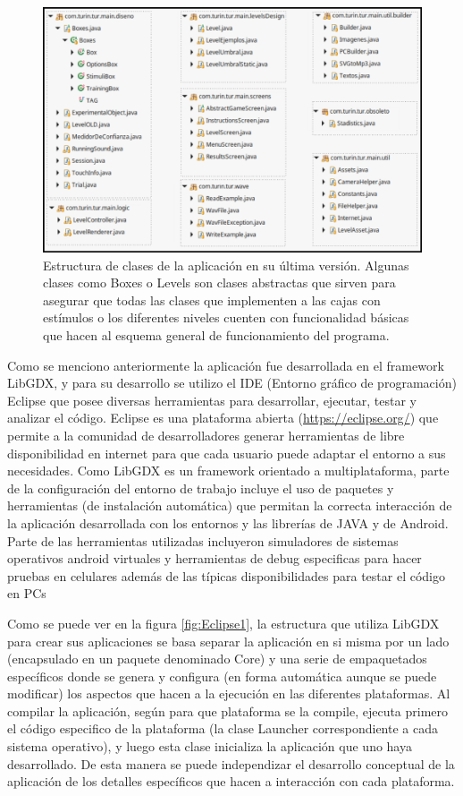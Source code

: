 \documentclass{article}
\begin{document}
    \begin{figure}
        \center
        \includegraphics[width=\textwidth]{Imagenes/Clases.png}
        \caption{Estructura de clases de la aplicación en su última versión. Algunas clases como Boxes o Levels son clases abstractas que sirven para asegurar que todas las clases que implementen a las cajas con estímulos o los diferentes niveles cuenten con funcionalidad básicas que hacen al esquema general de funcionamiento del programa.}
        \label{fig:Clases}
    \end{figure}
    
        
    Como se menciono anteriormente la aplicación fue desarrollada en el framework LibGDX, y para su desarrollo se utilizo el IDE (Entorno gráfico de programación) Eclipse que posee diversas herramientas para desarrollar, ejecutar, testar y analizar el código. Eclipse es una plataforma abierta (\url{https://eclipse.org/}) que permite a la comunidad de desarrolladores generar herramientas de libre disponibilidad en internet para que cada usuario puede adaptar el entorno a sus necesidades. Como LibGDX es un framework orientado a multiplataforma, parte de la configuración del entorno de trabajo incluye el uso de paquetes y herramientas (de instalación automática) que permitan la correcta interacción de la aplicación desarrollada con los entornos y las librerías de JAVA y de Android. Parte de las herramientas utilizadas incluyeron simuladores de sistemas operativos android virtuales y herramientas de debug especificas para hacer pruebas en celulares además de las típicas disponibilidades para testar el código en PCs
    
    Como se puede ver en la figura \ref{fig:Eclipse1}, la estructura que utiliza LibGDX para crear sus aplicaciones se basa separar la aplicación en si misma por un lado (encapsulado en un paquete denominado Core) y una serie de empaquetados específicos donde se genera y configura (en forma automática aunque se puede modificar) los aspectos que hacen a la ejecución en las diferentes plataformas. Al compilar la aplicación, según para que plataforma se la compile, ejecuta primero el código especifico de la plataforma (la clase Launcher correspondiente a cada sistema operativo), y luego esta clase inicializa la aplicación que uno haya desarrollado. De esta manera se puede independizar el desarrollo conceptual de la aplicación de los detalles específicos que hacen a interacción con cada plataforma. 
    
\end{document}
